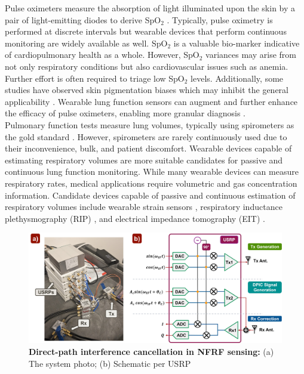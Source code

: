 \documentclass[journal]{IEEEtran}
\begin{document}
Pulse oximeters measure the absorption of light illuminated upon the skin by a pair of light-emitting diodes to derive SpO$_2$ \cite{jubranPulseOximetry2015}. Typically, pulse oximetry is performed at discrete intervals but wearable devices that perform continuous monitoring are widely available as well. SpO$_2$ is a valuable bio-marker indicative of cardiopulmonary health as a whole. However, SpO$_2$ variances may arise from not only respiratory conditions but also cardiovascular issues such as anemia. Further effort is often required to triage low SpO$_2$ levels. Additionally, some studies have observed skin pigmentation biases which may inhibit the general applicability \cite{cabanasSkinPigmentationInfluence2022}. Wearable lung function sensors can augment and further enhance the efficacy of pulse oximeters, enabling more granular diagnosis \cite{buekersWearableFingerPulse2019}\cite{buekersOxygenSaturationMeasurements2018}. \\
Pulmonary function tests measure lung volumes, typically using spirometers as the gold standard \cite{poncePulmonaryFunctionTests2024}. However, spirometers are rarely continuously used due to their inconvenience, bulk, and patient discomfort. Wearable devices capable of estimating respiratory volumes are more suitable candidates for passive and continuous lung function monitoring. While many wearable devices can measure respiratory rates, medical applications require volumetric and gas concentration information. Candidate devices capable of passive and continuous estimation of respiratory volumes include wearable strain sensors \cite{chuRespirationRateVolume2019}, respiratory inductance plethysmography (RIP) \cite{vitazkovaAdvancesRespiratoryMonitoring2024}, and electrical impedance tomography (EIT) \cite{adlerMonitoringChangesLung1997}. \\
\begin{figure}[htbp]
\centering
\includegraphics[width=.95\textwidth]{setup_dpic_v2.jpg}
\caption{\textbf{Direct-path interference cancellation in NFRF sensing:} (a) The system photo; (b) Schematic per USRP}
\label{fig:dpic}
\end{figure}
\end{document}
